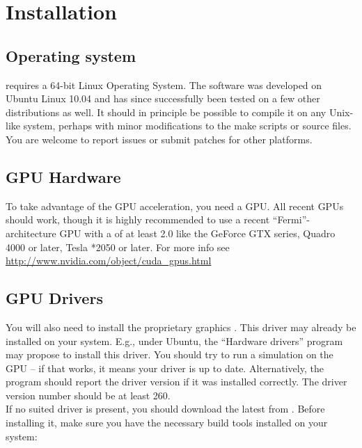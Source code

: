 \section{Installation}


\subsection{Operating system}

\mumax requires a 64-bit Linux Operating System. The software was developed on Ubuntu Linux 10.04 and has since successfully been tested on a few other distributions as well. It should in principle be possible to compile it on any Unix-like system, perhaps with minor modifications to the make scripts or source files. You are welcome to report issues or submit patches for other platforms.

\subsection{GPU Hardware}

To take advantage of the GPU acceleration, you need a  \nvidia GPU. All recent \nvidia GPUs should work, though it is highly recommended to use a recent ``Fermi''-architecture GPU with a  of at least 2.0 like the GeForce GTX series, Quadro 4000 or later, Tesla *2050 or later. For more info see \url{http://www.nvidia.com/object/cuda_gpus.html}

\subsection{GPU Drivers}

You will also need to install the proprietary \nvidia graphics . This driver may already be installed on your system. E.g., under Ubuntu, the ``Hardware drivers'' program may propose to install this driver. You should try to run a simulation on the GPU -- if that works, it means your driver is up to date. Alternatively, the program  should report the driver version if it was installed correctly. The driver version number should be at least 260.\\


If no suited driver is present, you should download the latest  from \nvidia. Before installing it, make sure you have the necessary build tools installed on your system:


